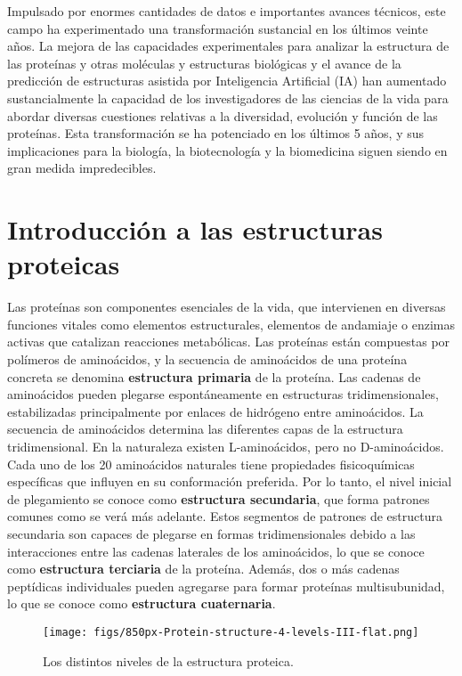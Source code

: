 Impulsado por enormes cantidades de datos e importantes avances técnicos, este campo ha experimentado una transformación sustancial en los últimos veinte años. La mejora de las capacidades experimentales para analizar la estructura de las proteínas y otras moléculas y estructuras biológicas y el avance de la predicción de estructuras asistida por Inteligencia Artificial (IA) han aumentado sustancialmente la capacidad de los investigadores de las ciencias de la vida para abordar diversas cuestiones relativas a la diversidad, evolución y función de las proteínas. Esta transformación se ha potenciado en los últimos 5 años, y sus implicaciones para la biología, la biotecnología y la biomedicina siguen siendo en gran medida impredecibles.

\section{Introducción a las estructuras proteicas}
Las proteínas son componentes esenciales de la vida, que intervienen en diversas funciones vitales como elementos estructurales, elementos de andamiaje o enzimas activas que catalizan reacciones metabólicas. Las proteínas están compuestas por polímeros de aminoácidos, y la secuencia de aminoácidos de una proteína concreta se denomina \textbf{estructura primaria} de la proteína. Las cadenas de aminoácidos pueden plegarse espontáneamente en estructuras tridimensionales, estabilizadas principalmente por enlaces de hidrógeno entre aminoácidos. La secuencia de aminoácidos determina las diferentes capas de la estructura tridimensional. En la naturaleza existen L-aminoácidos, pero no D-aminoácidos. Cada uno de los 20 aminoácidos naturales tiene propiedades fisicoquímicas específicas que influyen en su conformación preferida. Por lo tanto, el nivel inicial de plegamiento se conoce como \textbf{estructura secundaria}, que forma patrones comunes como se verá más adelante. Estos segmentos de patrones de estructura secundaria son capaces de plegarse en formas tridimensionales debido a las interacciones entre las cadenas laterales de los aminoácidos, lo que se conoce como \textbf{estructura terciaria} de la proteína. Además, dos o más cadenas peptídicas individuales pueden agregarse para formar proteínas multisubunidad, lo que se conoce como \textbf{estructura cuaternaria}.

\begin{figure}[h]
\centering
\texttt{[image: figs/850px-Protein-structure-4-levels-III-flat.png]}
\caption{Los distintos niveles de la estructura proteica.}
\end{figure}

